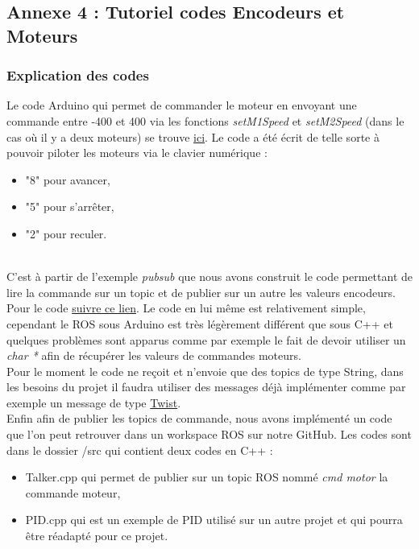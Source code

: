 \documentclass[french]{rapportENSTAB}
\begin{document}
\subsection{Annexe 4 : Tutoriel codes Encodeurs et Moteurs} \label{annexe4}
\subsubsection{Explication des codes}

Le code Arduino qui permet de commander le moteur en envoyant une commande entre -400 et 400 via les fonctions \textit{setM1Speed} et \textit{setM2Speed} (dans le cas où il y a deux moteurs) se trouve \href{https://github.com/AntoninLize/Projet_OrangeLabs/tree/master/Code/Arduino/Commande_moteur}{ici}. Le code a été écrit de telle sorte à pouvoir piloter les moteurs via le clavier numérique : \begin{itemize}[label=\textbullet, font=\small\color{blue}]
    \item "8" pour avancer,
    \item "5" pour s'arrêter,
    \item "2" pour reculer.
\end{itemize}\\

C'est à partir de l'exemple \textit{pubsub} que nous avons construit le code permettant de lire la commande sur un topic et de publier sur un autre les valeurs encodeurs. Pour le code \href{https://github.com/AntoninLize/Projet_OrangeLabs/tree/master/Code/Arduino/pubsub}{suivre ce lien}. Le code en lui même est relativement simple, cependant le ROS sous Arduino est très légèrement différent que sous C++ et quelques problèmes sont apparus comme par exemple le fait de devoir utiliser un \textit{char *} afin de récupérer les valeurs de commandes moteurs.\\

Pour le moment le code ne reçoit et n'envoie que des topics de type String, dans les besoins du projet il faudra utiliser des messages déjà implémenter comme par exemple un message de type \href{http://docs.ros.org/api/geometry_msgs/html/msg/Twist.html}{Twist}.\\

Enfin afin de publier les topics de commande, nous avons implémenté un code que l'on peut retrouver dans un workspace ROS sur notre GitHub. Les codes sont dans le dossier /src qui contient deux codes en C++ : 
\begin{itemize}[label=\textbullet, font=\small\color{blue}]
    \item Talker.cpp qui permet de publier sur un topic ROS nommé \textit{cmd motor} la commande moteur,
    \item PID.cpp qui est un exemple de PID utilisé sur un autre projet et qui pourra être réadapté pour ce projet.
\end{itemize}\\
\end{document}
